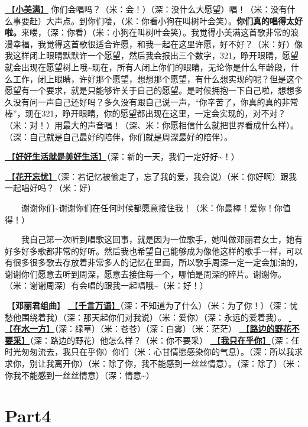 \documentclass[]{ctexbook}
\begin{document}
\hyperref[happy-ending]{🎵【\textbf{小美满}】} 你们会唱吗？（米：会！）（深：没什么大愿望）唱！（米：没有什么事要赶）大声点。到你们喽，（米：你看小狗在叫树叶会笑）。\textbf{你们真的唱得太好啦。}来喽，（深：你看）（米：小狗在叫树叶会笑）。我觉得小美满这首歌非常的浪漫幸福，我觉得这首歌很适合许愿，和我一起在这里许愿，好不好？（米：好）像我这样闭上眼睛默默许一个愿望，然后我会报出三个数字，321，睁开眼睛，愿望就会出现在愿望树上哦\textasciitilde 现在，所有人闭上你们的眼睛，无论你是什么年龄段，什么工作，闭上眼睛，许好那个愿望，想想那个愿望，有什么想实现的呢？但是这个愿望有一个要求，就是只能够许关于自己的愿望。是时候拥抱一下自己啦，想想多久没有问一声自己还好吗？多久没有跟自己说一声，``你辛苦了，你真的真的非常棒''，现在321，睁开眼睛，你的愿望都出现在这里，一定会实现的，对不对？（米：对！）用最大的声音唱！（深、米：你愿相信什么就把世界看成什么样）。（深：自己就是自己最好的陪伴，你们就是周深最好的陪伴）。

\hyperref[live-happy-life-happy]{🎵【\textbf{好好生活就是美好生活}】}（深：新的一天，我们一定好好\textasciitilde！）

\hyperref[no-worries]{🎵【\textbf{花开忘忧}】}（深：若记忆被偷走了，忘了我的爱，我会说）（米：你好啊）跟我一起唱好吗？（米：好）

  谢谢你们\textasciitilde 谢谢你们在任何时候都愿意接住我！（米：你最棒！爱你！你值得！）

  我自己第一次听到唱歌这回事，就是因为一位歌手，她叫做邓丽君女士，她有好多好多歌都非常的好听。然后我也希望自己能够成为像他这样的歌手一样，可以有很多很多歌去存放着非常多人的记忆在里面，所以歌手周深一定一定会加油的，谢谢你们愿意去听到周深，愿意去接住每一个，哪怕是周深的碎片。谢谢你。（米：谢谢周深）有会唱的跟我一起唱哦\textasciitilde（米：好！）

🎵【\textbf{邓丽君组曲}】
\hyperref[thousands-of-words]{🎵【\textbf{千言万语}】}（深：不知道为了什么）（米：为了你！）（深：忧愁他围绕着我）（深：那天起你们对我说）（米：爱你）（深：永远的爱着我）。
\hyperref[on-the-water-side]{🎵【\textbf{在水一方}】}（深：绿草）（米：苍苍）（深：白雾）（米：茫茫）
\hyperref[only-with-me]{🎵【\textbf{路边的野花不要采}】}（深：路边的野花）他怎么样？（米：你不要采）
\hyperref[only-you]{🎵【\textbf{我只在乎你}】}（深：任时光匆匆流去，我只在乎你）你们（米：心甘情愿感染你的气息）。（深：所以我求求你，别让我离开你）（米：除了你，我不能感到一丝丝情意）。（深：除了）（米：你我不能感到一丝丝情意）（深：情意\textasciitilde）

\section{Part4}\label{LasVegas-20250228-part4}
\end{document}
